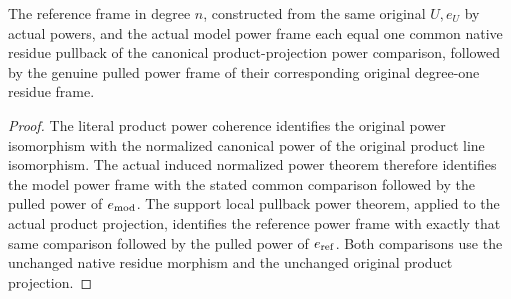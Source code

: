 \begin{theorem}\label{thm:native-tc-compatible-product-power-frames}
\leanok
{}
The reference frame in degree $n$, constructed from the same
original $U,e_U$ by actual powers, and the actual model power
frame each equal one common native residue pullback of the
canonical product-projection power comparison, followed by the
genuine pulled power frame of their corresponding original
degree-one residue frame.
\end{theorem}
\begin{proof}
The literal product power coherence identifies the original
power isomorphism with the normalized canonical power of the
original product line isomorphism. The actual induced normalized
power theorem therefore identifies the model power frame with
the stated common comparison followed by the pulled power of
$e_{\rm mod}$. The support local pullback power theorem, applied
to the actual product projection, identifies the reference power
frame with exactly that same comparison followed by the pulled
power of $e_{\rm ref}$. Both comparisons use the unchanged native
residue morphism and the unchanged original product projection.
\end{proof}

